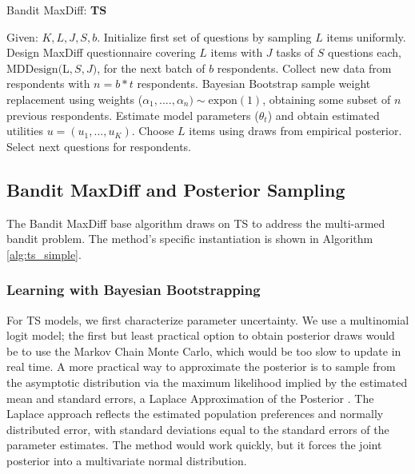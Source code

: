 \documentclass[nonblindrev]{informs3}
\newcommand{\ts}{\textbf{TS} }
\newcommand{\numperset}{L}
\begin{document}
\begin{algorithm}
\caption{Bandit MaxDiff: \ts} \label{alg:ts_simple}
\begin{algorithmic}[1]
\State Given: $K,\numperset,J,S,b$.
\State Initialize first set of questions by sampling $\numperset$ items uniformly.
\State Design MaxDiff questionnaire covering $\numperset$ items with $J$ tasks of $S$ questions each, $\text{MDDesign}($\numperset$,S,J)$, for the next batch of $b$ respondents.
\State Collect new data from respondents with $n = b*t$ respondents.
\State Bayesian Bootstrap sample weight replacement using weights ($\alpha_1, ...., \alpha_n)\sim \text{expon}(1)$, obtaining some subset of $n$ previous respondents.
\State Estimate model parameters ($\theta_t$) and obtain estimated utilities $u = (u_1,...,u_K)$.
\State Choose $\numperset$ items using draws from empirical posterior.
\State Select next questions for respondents.
\end{algorithmic}
\end{algorithm}



\subsection{Bandit MaxDiff and Posterior Sampling} \label{sec:bmd_ts_edts}

The Bandit MaxDiff base algorithm draws on TS to address the multi-armed bandit problem. The method's specific instantiation is shown in Algorithm \ref{alg:ts_simple}.
  
\subsubsection{Learning with Bayesian Bootstrapping}

For TS models, we first characterize parameter uncertainty. We use a multinomial logit model; the first but least practical option to obtain posterior draws would be to use the Markov Chain Monte Carlo, which would be too slow to update in real time. A more practical way to approximate the posterior is to sample from the asymptotic distribution via the maximum likelihood implied by the estimated mean and standard errors, a Laplace Approximation of the Posterior \citep{tierney1986accurate}. The Laplace approach reflects the estimated population preferences and normally distributed error, with standard deviations equal to the standard errors of the parameter estimates. The method would work quickly, but it forces the joint posterior into a multivariate normal distribution. 
\end{document}
